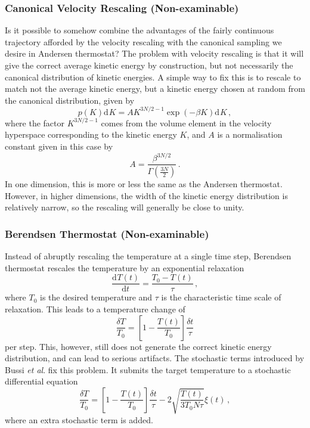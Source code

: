 \documentclass{article}
\theoremstyle{plain}\theoremheaderfont{\normalfont\itshape}\theorembodyfont{\rmfamily}\theoremseparator{.}\newtheorem*{rem}{Remark}\newtheorem*{ex}{Example}\newtheorem*{proof}{Proof}\newtheorem*{altp}{Alternative proof}
\theoremstyle{plain}\theoremheaderfont{\normalfont\bfseries}\theorembodyfont{\rmfamily}\theoremseparator{.}\newtheorem{thm}{Theorem}[section]\newtheorem{lem}[thm]{Lemma}\newtheorem{prop}[thm]{Proposition}\newtheorem*{cor}{Corollary}\newtheorem{defn}[thm]{Definition}\newtheorem{clm}[thm]{Claim}\newtheorem{clminproof}{Claim}\newtheorem{alg}[thm]{Algorithm}\newtheorem{hyp}[thm]{Hypothesis}\newtheorem{law}[thm]{Law}
\theoremstyle{break}\theoremheaderfont{\normalfont\itshape}\theorembodyfont{\rmfamily}\theoremseparator{.\medskip}\newtheorem*{proofskip}{Proof}\newtheorem*{exs}{Examples}\newtheorem*{rems}{Remarks}
\theoremstyle{break}\theoremheaderfont{\normalfont\bfseries}\theorembodyfont{\rmfamily}\theoremseparator{.\medskip}\newtheorem{lemskip}[thm]{Lemma}\newtheorem{defnskip}[thm]{Definition}\newtheorem{propskip}[thm]{Proposition}\newtheorem{thmskip}[thm]{Theorem}
\numberwithin{equation}{section}
\renewcommand{\d}[2][]{\mathrm{d}^{#1} #2}
\newcommand{\dv}[3][]{\frac{\mathrm{d}^{#1} #2}{{\mathrm{d} #3}^{#1}}}
\begin{document}
    \subsubsection*{Canonical Velocity Rescaling (Non-examinable)}
    Is it possible to somehow combine the advantages of the fairly continuous trajectory afforded by the velocity rescaling with the canonical sampling we desire in Andersen thermostat? The problem with velocity rescaling is that it will give the correct average kinetic energy by construction, but not necessarily the canonical distribution of kinetic energies. A simple way to fix this is to rescale to match not the average kinetic energy, but a kinetic energy chosen at random from the canonical distribution, given by
    \begin{equation}
        p(K)\d{K}=AK^{3N/2-1}\exp(-\beta K)\d{K}\,,
    \end{equation}
    where the factor \(K^{3N/2-1}\) comes from the volume element in the velocity hyperspace corresponding to the kinetic energy \(K\), and \(A\) is a normalisation constant given in this case by
    \begin{equation}
        A=\frac{\beta^{3N/2}}{\Gamma(\frac{3N}{2})}\,.
    \end{equation}
    In one dimension, this is more or less the same as the Andersen thermostat. However, in higher dimensions, the width of the kinetic energy distribution is relatively narrow, so the rescaling will generally be close to unity.

    \subsubsection*{Berendsen Thermostat (Non-examinable)}
    Instead of abruptly rescaling the temperature at a single time step, Berendsen thermostat rescales the temperature by an exponential relaxation
    \begin{equation}
        \dv{T(t)}{t}=\frac{T_0-T(t)}{\tau}\,,
    \end{equation}
    where \(T_0\) is the desired temperature and \(\tau\) is the characteristic time scale of relaxation. This leads to a temperature change of
    \begin{equation}
        \frac{\delta T}{T_0}=\left[1-\frac{T(t)}{T_0}\right]\frac{\delta t}{\tau}
    \end{equation}
    per step. This, however, still does not generate the correct kinetic energy distribution, and can lead to serious artifacts. The stochastic terms introduced by Bussi \textit{et al}. fix this problem. It submits the target temperature to a stochastic differential equation
    \begin{equation}
        \frac{\delta T}{T_0}=\left[1-\frac{T(t)}{T_0}\right]\frac{\delta t}{\tau}-2\sqrt{\frac{T(t)}{3T_0 N\tau}}\xi(t)\,,
    \end{equation}
    where an extra stochastic term is added.
\end{document}
